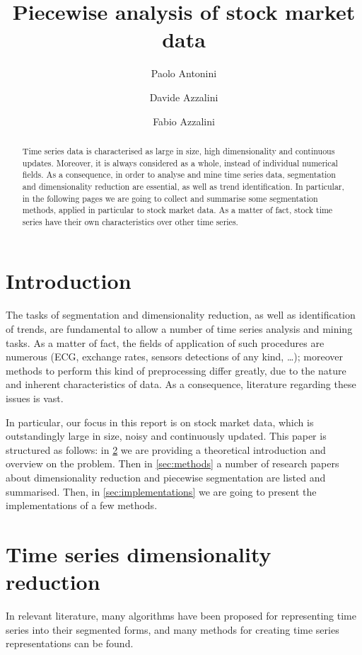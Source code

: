 \documentclass[a4paper]{article}
\title{Piecewise analysis of stock market data}
\author{Paolo Antonini \and Davide Azzalini \and Fabio Azzalini}
\date{}
\begin{document}
\maketitle

\begin{abstract}
Time series data is characterised as large in size, high dimensionality and continuous updates. Moreover, it is always considered as a whole, instead of individual numerical fields. As a consequence, in order to analyse and mine time series data, segmentation and dimensionality reduction are essential, as well as trend identification. In particular, in the following pages we are going to collect and summarise some segmentation methods, applied in particular to stock market data. As a matter of fact, stock time series have their own characteristics over other time series. 
\end{abstract}




\section{Introduction}
The tasks of segmentation and dimensionality reduction, as well as identification of trends, are fundamental to allow a number of time series analysis and mining tasks. As a matter of fact, the fields of application of such procedures are numerous (ECG, exchange rates, sensors detections of any kind, \dots); moreover methods to perform this kind of preprocessing differ greatly, due to the nature and inherent characteristics of data. As a consequence, literature regarding these issues is vast. 

In particular, our focus in this report is on stock market data, which is outstandingly large in size, noisy and continuously updated. This paper is structured as follows: in \cref{sec:theory} we are providing a theoretical introduction and overview on the problem. Then in \cref{sec:methods} a number of research papers about dimensionality reduction and piecewise segmentation are listed and summarised. Then, in \cref{sec:implementations} we are going to present the implementations of a few methods. 



\section{Time series dimensionality reduction}\label{sec:theory}

In relevant literature, many algorithms have been proposed for representing time series into their segmented forms, and many methods for creating time series representations can be found.
\end{document}
